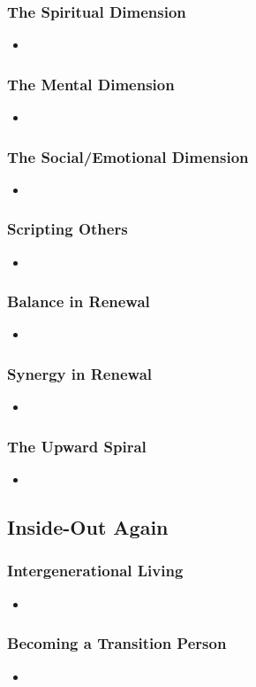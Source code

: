 \documentclass[11pt]{article}
\begin{document}
\subsubsection{The Spiritual Dimension}
\begin{itemize}
\item 
\end{itemize}
\subsubsection{The Mental Dimension}
\begin{itemize}
\item 
\end{itemize}
\subsubsection{The Social/Emotional Dimension}
\begin{itemize}
\item 
\end{itemize}
\subsubsection{Scripting Others}
\begin{itemize}
\item 
\end{itemize}
\subsubsection{Balance in Renewal}
\begin{itemize}
\item 
\end{itemize}
\subsubsection{Synergy in Renewal}
\begin{itemize}
\item 
\end{itemize}
\subsubsection{The Upward Spiral}
\begin{itemize}
\item 
\end{itemize}
\subsection{Inside-Out Again}
\subsubsection{Intergenerational Living}
\begin{itemize}
\item 
\end{itemize}
\subsubsection{Becoming a Transition Person}
\begin{itemize}
\item 
\end{itemize}
\newpage


\end{document}
